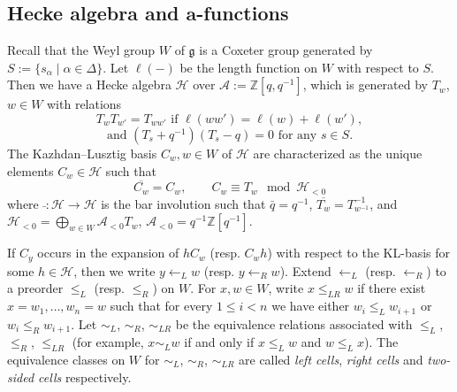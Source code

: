 \documentclass[reqno,12pt]{amsart}
\numberwithin{equation}{section}
\theoremstyle{plain}
\newtheorem{Prop}[Thm]{Proposition}
\theoremstyle{definition}
\newcommand{\al}{\alpha}
\newcommand{\mc}[1]{\mathcal{#1}}
\newcommand{\mf}[1]{\mathfrak{#1}}
\newcommand{\rar}{\rightarrow}
\newcommand{\aff}{ \mathbf{a} }
\newcommand{\lest}{\leqslant}
\begin{document}






\subsection{Hecke algebra and \texorpdfstring{$\aff$}{}-functions}\label{sec:cell}



Recall that the Weyl group $ W  $ of $ \mf{g} $ is a Coxeter group generated by $S:=\{s_\al\mid\al\in\Delta \}$. Let $\ell(-)$ be the length function on $W$ with respect to $S$. Then we have a Hecke algebra $ \mc{H} $ over $ \mathcal{A} :=\mathbb{Z}[q,q^{-1}]$, which is generated by $ T_w $, $ w\in W $ with relations \[
T_wT_{w'}=T_{ww'} \text{ if }\ell(ww')=\ell(w)+\ell(w'),
\]\[
\text{and }(T_s+q^{-1})(T_s-q)=0 \text{ for any }s\in S.
\]
The Kazhdan--Lusztig basis $C_w, w\in W$ of $ \mc{H} $ are characterized as the unique elements $ C_w \in \mc{H}$ such that
\[
\overline{C_w}=C_w,\qquad C_w\equiv T_w \mod{\mc{H}_{<0}}
\]where $ \bar{\,} :\mc{H}\rar\mc{H}$ is the bar involution such that $ \bar{q}=q^{-1} $, $ \overline{T_w} =T_{w^{-1}}^{-1}$, and $ \mc{H}_{<0}=\bigoplus_{w\in W}\mathcal{A}_{<0}T_w $, $ \mathcal{A}_{<0}=q^{-1}\mathbb{Z}[q^{-1}] $.

If $ C_y $ occurs in the expansion of $ hC_w $ (resp. $C_wh$) with respect to the KL-basis for some $ h\in\mc{H} $, then we write $ y\leftarrow_L w $ (resp. $ y\leftarrow_R w $). Extend $ \leftarrow_L $ (resp. $ \leftarrow_R $) to a preorder $ \lest_L $ (resp. $\lest _R$) on $ W $. For $x, w\in W$, write $x \lest_{LR} w$ if there exist $x=w_1, \dots, w_n=w$ such that for every $1\lest i<n$ we have either $w_i\lest_L w_{i+1}$ or $w_i\lest_R w_{i+1}$. Let $\sim_{L}$, $\sim_{R}$, $\sim_{LR}$ be the equivalence relations associated with $\lest_L$, $\lest_R$, $\lest_{LR}$ (for example, $x\sim_{L}w$ if and only if $x\lest_L w$ and $w\lest_Lx$). The equivalence classes on $W$ for $\sim_L$, $\sim_R$, $\sim_{LR}$ are called \textit{left cells}, \textit{right cells} and \textit{two-sided cells} respectively. 
\end{document}
